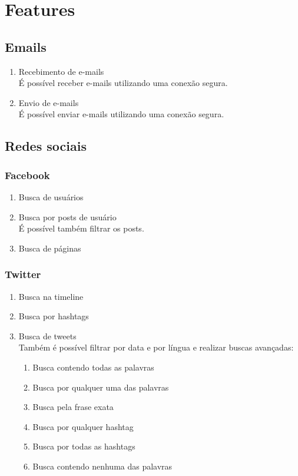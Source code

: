 \section{Features}
\subsection{Emails}
\begin{enumerate}
\item Recebimento de e-mails\\
É possível receber e-mails utilizando uma conexão segura.

\item Envio de e-mails\\
É possível enviar e-mails utilizando uma conexão segura.

\end{enumerate}

\subsection{Redes sociais}
\subsubsection{Facebook}
\begin{enumerate}
\item Busca de usuários
\item Busca por posts de usuário\\
É possível também filtrar os posts.
\item Busca de páginas
\end{enumerate}

\subsubsection{Twitter}
\begin{enumerate}
\item Busca na timeline
\item Busca por hashtags
\item Busca de tweets\\
Também é possível filtrar por data e por língua e realizar buscas avançadas:
\begin{enumerate}
\item Busca contendo todas as palavras
\item Busca por qualquer uma das palavras
\item Busca pela frase exata
\item Busca por qualquer hashtag
\item Busca por todas as hashtags
\item Busca contendo nenhuma das palavras
\end{enumerate}
\end{enumerate}

